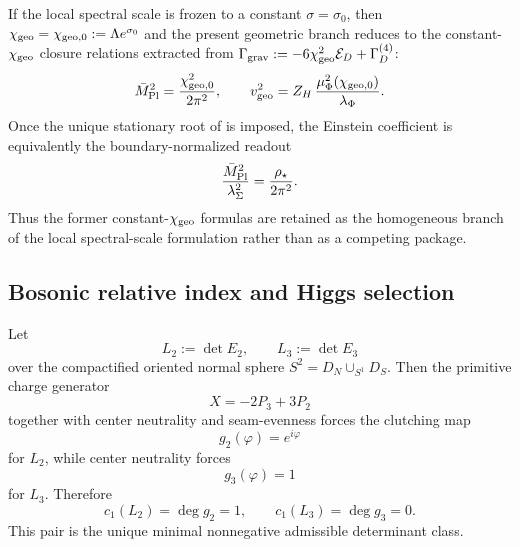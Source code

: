 \begin{corollary}
\label{cor:constant-scale-reduction}
If the local spectral scale is frozen to a constant $\sigma=\sigma_0$, then
$\chi_{\mathrm{geo}}=\chi_{\mathrm{geo},0}:=\Lambda e^{\sigma_0}$ and the present geometric branch reduces to the
constant-$\chi_{\mathrm{geo}}$ closure relations extracted from
$\Gamma_{\mathrm{grav}}:=-6\chi_{\mathrm{geo}}^2\mathcal E_D+\Gamma_D^{(4)}$:
\[
\bar M_{\mathrm{Pl}}^2=\frac{\chi_{\mathrm{geo},0}^2}{2\pi^2},
\qquad
v_{\mathrm{geo}}^2=Z_H\,\frac{\mu_\Phi^2(\chi_{\mathrm{geo},0})}{\lambda_\Phi}.
\]
Once the unique stationary root of  is imposed, the
Einstein coefficient is equivalently the boundary-normalized readout
\[
\frac{\bar M_{\mathrm{Pl}}^2}{\lambda_\Sigma^2}=\frac{\rho_\star}{2\pi^2}.
\]
Thus the former constant-$\chi_{\mathrm{geo}}$ formulas are retained as the homogeneous branch of the local
spectral-scale formulation rather than as a competing package.
\end{corollary}


\subsection{Bosonic relative index and Higgs selection}

\begin{theorem}
\label{thm:determinant-class-higgs-selection}
\label{thm:determinant-clutching}
Let
\[
L_2:=\det E_2,
\qquad
L_3:=\det E_3
\]
over the compactified oriented normal sphere $S^2=D_N\cup_{S^1}D_S$. Then the primitive charge
generator
\[
X=-2P_3+3P_2
\]
together with center neutrality and seam-evenness forces the clutching map
\[
g_2(\varphi)=e^{i\varphi}
\]
for $L_2$, while center neutrality forces
\[
g_3(\varphi)=1
\]
for $L_3$. Therefore
\[
c_1(L_2)=\deg g_2=1,
\qquad
c_1(L_3)=\deg g_3=0.
\]
This pair is the unique minimal nonnegative admissible determinant class.
\end{theorem}

